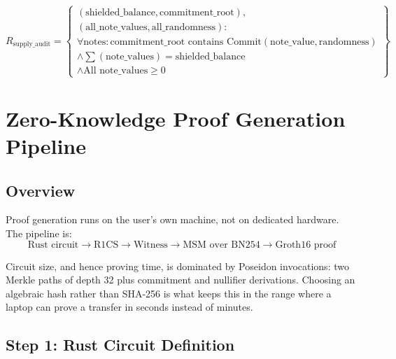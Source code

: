 \documentclass[11pt,a4paper]{article}
\begin{document}
\begin{equation}
R_{\text{supply\_audit}} = \left\{
\begin{array}{l}
(\text{shielded\_balance}, \text{commitment\_root}), \\
(\text{all\_note\_values}, \text{all\_randomness}): \\[0.5em]
\forall \text{notes}: \text{commitment\_root contains } \text{Commit}(\text{note\_value}, \text{randomness}) \\
\land \sum(\text{note\_values}) = \text{shielded\_balance} \\
\land \text{All note\_values} \geq 0
\end{array}
\right\}
\end{equation}

\section{Zero-Knowledge Proof Generation Pipeline}
\label{sec:zkpipeline}

\subsection{Overview}

Proof generation runs on the user's own machine, not on dedicated hardware. The pipeline is:
\begin{equation}
\text{Rust circuit} \to \text{R1CS} \to \text{Witness} \to \text{MSM over BN254} \to \text{Groth16 proof}
\end{equation}

Circuit size, and hence proving time, is dominated by Poseidon invocations: two Merkle paths of depth 32 plus commitment and nullifier derivations. Choosing an algebraic hash rather than SHA-256 is what keeps this in the range where a laptop can prove a transfer in seconds instead of minutes.

\subsection{Step 1: Rust Circuit Definition}
\end{document}
